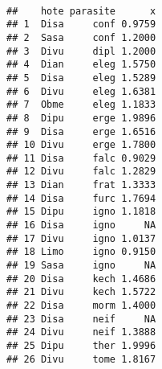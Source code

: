 \begin{knitrout}
\color{fgcolor}\begin{kframe}
\begin{flushleft}
\ttfamily\noindent
{}\hlkeyword{(}\hlkeyword{\usebox{\hlnormalsizeboxdollar}}\hlkeyword{,}{\ }\hlargument{=}{\ }\hlkeyword{(}\hlargument{=}{\ }\hlkeyword{\usebox{\hlnormalsizeboxdollar}}\hlkeyword{,}{\ }\hlargument{=}{\ }\hlkeyword{\usebox{\hlnormalsizeboxdollar}}\hlkeyword{)}\hlkeyword{,}\hspace*{\fill}\\
\hlstd{}{\ }{\ }{\ }{\ }\hlkeyword{)}\mbox{}
\normalfont
\end{flushleft}
\begin{verbatim}
##    hote parasite      x
## 1  Disa     conf 0.9759
## 2  Sasa     conf 1.2000
## 3  Divu     dipl 1.2000
## 4  Dian     eleg 1.5750
## 5  Disa     eleg 1.5289
## 6  Divu     eleg 1.6381
## 7  Obme     eleg 1.1833
## 8  Dipu     erge 1.9896
## 9  Disa     erge 1.6516
## 10 Divu     erge 1.7800
## 11 Disa     falc 0.9029
## 12 Divu     falc 1.2829
## 13 Dian     frat 1.3333
## 14 Disa     furc 1.7694
## 15 Dipu     igno 1.1818
## 16 Disa     igno     NA
## 17 Divu     igno 1.0137
## 18 Limo     igno 0.9150
## 19 Sasa     igno     NA
## 20 Disa     kech 1.4686
## 21 Divu     kech 1.5722
## 22 Disa     morm 1.4000
## 23 Disa     neif     NA
## 24 Divu     neif 1.3888
## 25 Dipu     ther 1.9996
## 26 Divu     tome 1.8167
\end{verbatim}
\end{kframe}
\end{knitrout}

